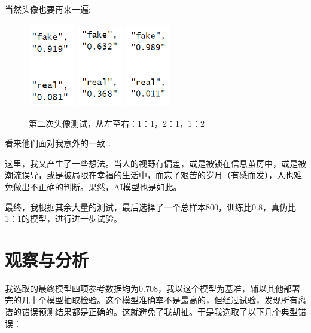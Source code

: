 \documentclass[boldfont,linespread=1.35]{ctexart}
\begin{document}
当然头像也要再来一遍:
\begin{figure}[h]
	\centering
	{\includegraphics[width=2cm]{1111}}
	{\includegraphics[width=2cm]{1112}}
	{\includegraphics[width=2cm]{1113}}
	\color{gray}\caption{第二次头像测试，从左至右：1：1，2：1，1：2}
\end{figure}

看来他们面对我意外的一致\ldots

这里，我又产生了一些想法。当人的视野有偏差，或是被锁在信息茧房中，或是被潮流误导，或是被局限在幸福的生活中，而忘了艰苦的岁月（有感而发），人也难免做出不正确的判断。果然，AI模型也是如此。

最终，我根据其余大量的测试，最后选择了一个总样本800，训练比0.8，真伪比1：1的模型，进行进一步试验。

\section{观察与分析}
我选取的最终模型四项参考数据均为0.708，我以这个模型为基准，辅以其他部署完的几十个模型抽取检验。这个模型准确率不是最高的，但经过试验，发现所有离谱的错误预测结果都是正确的。这就避免了我胡扯。于是我选取了以下几个典型错误：
\end{document}
